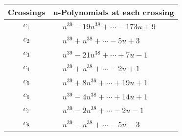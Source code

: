 \documentclass[1p]{elsarticle_modified}
\theoremstyle{definition}
\begin{document}
\begin{tabular}{m{50pt}|m{274pt}}
Crossings & \hspace{64pt}u-Polynomials at each crossing \\
\hline $$\begin{aligned}c_{1}\end{aligned}$$&$\begin{aligned}
&u^{39}-19 u^{38}+\cdots-173 u+9
\end{aligned}$\\
\hline $$\begin{aligned}c_{2}\end{aligned}$$&$\begin{aligned}
&u^{39}+u^{38}+\cdots-5 u+3
\end{aligned}$\\
\hline $$\begin{aligned}c_{3}\end{aligned}$$&$\begin{aligned}
&u^{39}-21 u^{38}+\cdots+7 u-1
\end{aligned}$\\
\hline $$\begin{aligned}c_{4}\end{aligned}$$&$\begin{aligned}
&u^{39}+u^{38}+\cdots-2 u+1
\end{aligned}$\\
\hline $$\begin{aligned}c_{5}\end{aligned}$$&$\begin{aligned}
&u^{39}+8 u^{36}+\cdots+19 u+1
\end{aligned}$\\
\hline $$\begin{aligned}c_{6}\end{aligned}$$&$\begin{aligned}
&u^{39}-4 u^{38}+\cdots+14 u+1
\end{aligned}$\\
\hline $$\begin{aligned}c_{7}\end{aligned}$$&$\begin{aligned}
&u^{39}-2 u^{38}+\cdots-2 u-1
\end{aligned}$\\
\hline $$\begin{aligned}c_{8}\end{aligned}$$&$\begin{aligned}
&u^{39}- u^{38}+\cdots-5 u-3
\end{aligned}$\\

\end{tabular}
\end{document}

